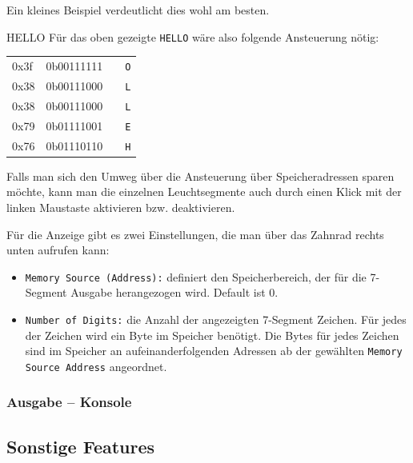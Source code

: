 Ein kleines Beispiel verdeutlicht dies wohl am besten.

\begin{exampleblock}{HELLO}
	Für das oben gezeigte \texttt{HELLO} wäre also folgende Ansteuerung nötig:\\
	\begin{tabular}{llll}
	0x3f & 0b00111111 & & \texttt{O}\\
	0x38 & 0b00111000 & & \texttt{L}\\
	0x38 & 0b00111000 & & \texttt{L}\\
	0x79 & 0b01111001 & & \texttt{E}\\
	0x76 & 0b01110110 & & \texttt{H}\\
	\end{tabular}
\end{exampleblock}

Falls man sich den Umweg über die Ansteuerung über Speicheradressen sparen möchte, 
kann man die einzelnen Leuchtsegmente auch durch einen Klick mit der linken Maustaste aktivieren bzw. deaktivieren. 

Für die Anzeige gibt es zwei Einstellungen, die man über das Zahnrad rechts unten aufrufen kann:\\
\begin{itemize}
\item \texttt{Memory Source (Address):} definiert den Speicherbereich, der für die 7-Segment Ausgabe herangezogen wird. Default ist 0.
\item \texttt{Number of Digits:} die Anzahl der angezeigten 7-Segment Zeichen. Für jedes der Zeichen wird ein Byte im Speicher benötigt. 
					Die Bytes für jedes Zeichen sind im Speicher an aufeinanderfolgenden Adressen ab der gewählten  \texttt{Memory Source Address} angeordnet.
\end{itemize}



\subsubsection{Ausgabe -- Konsole}


\subsection{Sonstige Features}